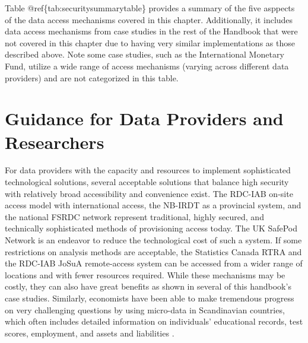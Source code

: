 Table @ref\{tab:securitysummarytable\} provides a summary of the five asppects of the data access mechanisms covered in this chapter. Additionally, it includes data access mechanisms from case studies in the rest of the Handbook that were not covered in this chapter due to having very similar implementations as those described above. Note some case studies, such as the International Monetary Fund, utilize a wide range of access mechanisms (varying across different data providers) and are not categorized in this table.



\hypertarget{guidance-for-data-providers-and-researchers}{%
\section{Guidance for Data Providers and Researchers}\label{guidance-for-data-providers-and-researchers}}

For data providers with the capacity and resources to implement sophisticated technological solutions, several acceptable solutions that balance high security with relatively broad accessibility and convenience exist. The RDC-IAB on-site access model with international access, the NB-IRDT as a provincial system, and the national FSRDC network represent traditional, highly secured, and technically sophisticated methods of provisioning access today. The UK SafePod Network is an endeavor to reduce the technological cost of such a system. If some restrictions on analysis methods are acceptable, the Statistics Canada RTRA and the RDC-IAB JoSuA remote-access system can be accessed from a wider range of locations and with fewer resources required. While these mechanisms may be costly, they can also have great benefits as shown in several of this handbook's case studies. Similarly, economists have been able to make tremendous progress on very challenging questions by using micro-data in Scandinavian countries, which often includes detailed information on individuals' educational records, test scores, employment, and assets and liabilities \citep{maret-ouda2017, cesarini2017}.

